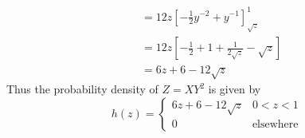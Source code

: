 \documentclass[answers,12pt,addpoints]{exam}
\begin{document}
\begin{questions}
\begin{solution}
\begin{align*}
            &= 12z \left[ -\frac{1}{2}y^{-2} + y^{-1} \right]_{\sqrt{z}}^{1}\\
            &= 12z \left[ -\frac{1}{2} + 1 + \frac{1}{2\sqrt{z}} - \sqrt{z} \right]\\
            &= 6z + 6 -12\sqrt{z}
        \end{align*}
        Thus the probability density of \( Z = XY^2 \) is given by
        $$ h(z) =  \begin{cases}
            6z + 6 -12\sqrt{z} & 0 < z < 1\\
            0 & \text{elsewhere}
        \end{cases}$$
    \end{solution}
\end{questions}
\end{document}
